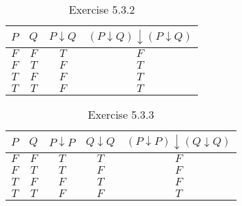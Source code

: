   \begin{table}[h]
    \centering
    \label{tab:ex5-3-2 }
    \begin{tabular}{|c|c|c|c|}
      \hline
      $P$ & $Q$ & $P \downarrow Q$ & $(P \downarrow Q) \downarrow (P \downarrow Q)$\\
      \hline 
      $F$ & $F$ & $T$ & $F$\\    
      $F$ & $T$ & $F$ & $T$\\
      $T$ & $F$ & $F$ & $T$\\
      $T$ & $T$ & $F$ & $T$\\ 
      \hline
    \end{tabular}
    \caption{Exercise 5.3.2}
  \end{table}

  \begin{table}[h]
    \centering
    \label{tab:ex5-3-3 }
    \begin{tabular}{|c|c|c|c|c|}
      \hline
      $P$ & $Q$ & $P \downarrow P$ & $Q \downarrow Q$ & $(P \downarrow P) \downarrow (Q \downarrow Q)$\\
      \hline 
      $F$ & $F$ & $T$ & $T$ & $F$\\   
      $F$ & $T$ & $T$ & $F$ & $F$\\
      $T$ & $F$ & $F$ & $T$ & $F$\\
      $T$ & $T$ & $F$ & $F$ & $T$\\    
      \hline
    \end{tabular}
    \caption{Exercise 5.3.3}
  \end{table}

\newpage

\qs{}{
}
